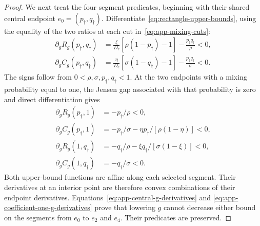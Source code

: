 \documentclass[11pt]{article}
\theoremstyle{remark}
\theoremstyle{plain}
\begin{document}
\begin{proof}
We next treat the four segment predicates, beginning with their
shared central endpoint $e_0=(p_\dagger,q_\dagger)$.
Differentiate~\eqref{eq:rectangle-upper-bounds}, using the equality
of the two ratios at each cut in~\eqref{eq:app-mixing-cuts}:
\begin{equation}
 \begin{aligned}
 \partial_gR_g(p_\dagger,q_\dagger)
 &=\frac{\xi}{D_r}[\rho(1-p_\dagger)-1]
                       -\frac{p_\dagger q_\dagger}{\rho}<0,\\
 \partial_gC_g(p_\dagger,q_\dagger)
 &=\frac{\eta}{D_c}[\sigma(1-q_\dagger)-1]
                       -\frac{p_\dagger q_\dagger}{\sigma}<0.
 \end{aligned}
 \label{eq:app-central-g-derivatives}
\end{equation}
The signs follow from $0<\rho,\sigma,p_\dagger,q_\dagger<1$.
At the two endpoints with a mixing probability equal to one, the
Jensen gap associated with that probability is zero and direct
differentiation gives
\begin{equation}
 \begin{aligned}
 \partial_gR_g(p_\dagger,1)&=-p_\dagger/\rho<0,\\
 \partial_gC_g(p_\dagger,1)
 &=-p_\dagger/\sigma-\eta p_\dagger/[\rho(1-\eta)]<0,\\
 \partial_gR_g(1,q_\dagger)
 &=-q_\dagger/\rho-\xi q_\dagger/[\sigma(1-\xi)]<0,\\
 \partial_gC_g(1,q_\dagger)&=-q_\dagger/\sigma<0.
 \end{aligned}
 \label{eq:app-coefficient-one-g-derivatives}
\end{equation}
Both upper-bound functions are affine along each selected segment.
Their derivatives at an interior point are therefore convex
combinations of their endpoint derivatives.
Equations~\eqref{eq:app-central-g-derivatives} and
\eqref{eq:app-coefficient-one-g-derivatives} prove that lowering
$g$ cannot decrease either bound on the segments from $e_0$ to
$e_2$ and $e_4$. Their predicates are preserved.


\end{proof}
\end{document}
